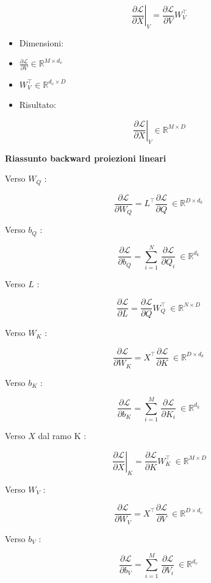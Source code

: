\documentclass[
  11pt,
]{article}
\begin{document}
\[\left. \ \frac{\partial\mathcal{L}}{\partial X} \right|_{V} = \frac{\partial\mathcal{L}}{\partial V}W_{V}^{\top}\]

\begin{itemize}
\item
  Dimensioni:
\item
  \(\frac{\partial\mathcal{L}}{\partial V} \in \mathbb{R}^{M \times d_{v}}\)
\item
  \(W_{V}^{\top} \in \mathbb{R}^{d_{v} \times D}\)
\item
  Risultato:
\end{itemize}

\[\left. \ \frac{\partial\mathcal{L}}{\partial X} \right|_{V} \in \mathbb{R}^{M \times D}\]

\textbf{Riassunto backward proiezioni lineari}

Verso \(W_{Q}\) :

\[\frac{\partial\mathcal{L}}{\partial W_{Q}} = L^{\top}\frac{\partial\mathcal{L}}{\partial Q}\  \in \mathbb{R}^{D \times d_{k}}\]

Verso \(b_{Q}\) :

\[\frac{\partial\mathcal{L}}{\partial b_{Q}} = \sum_{i = 1}^{N}\,\frac{\partial\mathcal{L}}{\partial Q_{i}}\  \in \mathbb{R}^{d_{k}}\]

Verso \(L\) :

\[\frac{\partial\mathcal{L}}{\partial L} = \frac{\partial\mathcal{L}}{\partial Q}W_{Q}^{\top}\  \in \mathbb{R}^{N \times D}\]

Verso \(W_{K}\) :

\[\frac{\partial\mathcal{L}}{\partial W_{K}} = X^{\top}\frac{\partial\mathcal{L}}{\partial K}\  \in \mathbb{R}^{D \times d_{k}}\]

Verso \(b_{K}\) :

\[\frac{\partial\mathcal{L}}{\partial b_{K}} = \sum_{i = 1}^{M}\,\frac{\partial\mathcal{L}}{\partial K_{i}}\  \in \mathbb{R}^{d_{k}}\]

Verso \(X\) dal ramo K :

\[\left. \ \frac{\partial\mathcal{L}}{\partial X} \right|_{K} = \frac{\partial\mathcal{L}}{\partial K}W_{K}^{\top}\  \in \mathbb{R}^{M \times D}\]

Verso \(W_{V}\) :

\[\frac{\partial\mathcal{L}}{\partial W_{V}} = X^{\top}\frac{\partial\mathcal{L}}{\partial V}\  \in \mathbb{R}^{D \times d_{v}}\]

Verso \(b_{V}\) :

\[\frac{\partial\mathcal{L}}{\partial b_{V}} = \sum_{i = 1}^{M}\,\frac{\partial\mathcal{L}}{\partial V_{i}}\  \in \mathbb{R}^{d_{v}}\]
\end{document}

